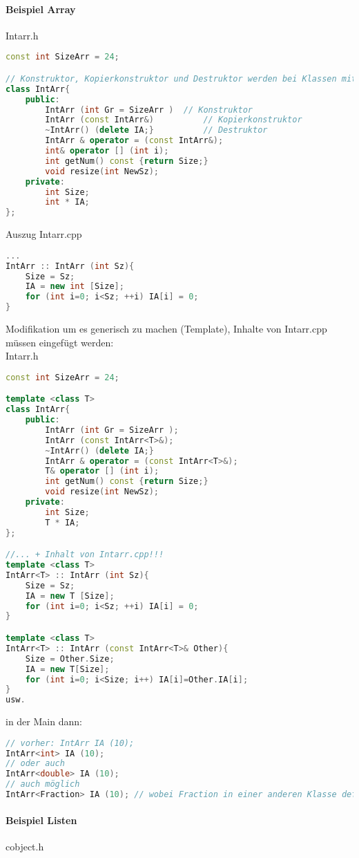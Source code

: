 \paragraph{Beispiel Array} Intarr.h
\begin{lstlisting}[language=C++]
const int SizeArr = 24;

// Konstruktor, Kopierkonstruktor und Destruktor werden bei Klassen mit Pointer immer benötigt!
class IntArr{
	public:
		IntArr (int Gr = SizeArr ) 	// Konstruktor
		IntArr (const IntArr&) 			// Kopierkonstruktor
		~IntArr() (delete IA;}			// Destruktor
		IntArr & operator = (const IntArr&);
		int& operator [] (int i);	
		int getNum() const {return Size;}
		void resize(int NewSz);
	private:
		int Size;
		int * IA;
};
\end{lstlisting}
Auszug Intarr.cpp
\begin{lstlisting}[language=C++]
...
IntArr :: IntArr (int Sz){
	Size = Sz;
	IA = new int [Size];
	for (int i=0; i<Sz; ++i) IA[i] = 0;
}
\end{lstlisting}
Modifikation um es generisch zu machen (Template), Inhalte von Intarr.cpp müssen eingefügt werden:\\
Intarr.h
\begin{lstlisting}[language=C++]
const int SizeArr = 24;

template <class T>
class IntArr{
	public:
		IntArr (int Gr = SizeArr );
		IntArr (const IntArr<T>&);
		~IntArr() (delete IA;}
		IntArr & operator = (const IntArr<T>&);
		T& operator [] (int i);	
		int getNum() const {return Size;}
		void resize(int NewSz);
	private:
		int Size;
		T * IA;
};

//... + Inhalt von Intarr.cpp!!!
template <class T>
IntArr<T> :: IntArr (int Sz){
	Size = Sz;
	IA = new T [Size];
	for (int i=0; i<Sz; ++i) IA[i] = 0;
}

template <class T>
IntArr<T> :: IntArr (const IntArr<T>& Other){
	Size = Other.Size;
	IA = new T[Size];
	for (int i=0; i<Size; i++) IA[i]=Other.IA[i];
}
usw.
\end{lstlisting}
in der Main dann:
\begin{lstlisting}[language=C++]
// vorher: IntArr IA (10);
IntArr<int> IA (10);
// oder auch 
IntArr<double> IA (10);
// auch möglich 
IntArr<Fraction> IA (10); // wobei Fraction in einer anderen Klasse definiert ist.
\end{lstlisting}

\paragraph{Beispiel Listen}
cobject.h

